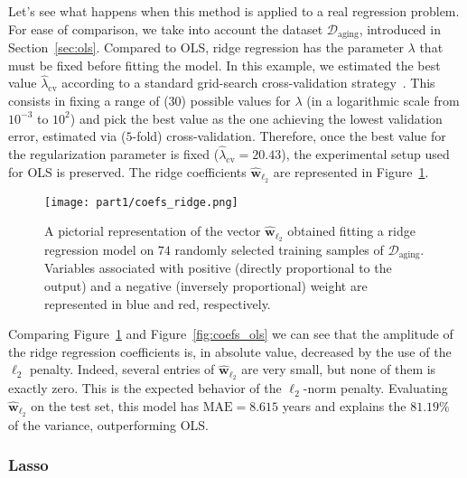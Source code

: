 			Let's see what happens when this method is applied to a real regression problem. For ease of comparison, we take into account the dataset $\mathcal{D}_{\text{aging}}$, introduced in Section~\ref{sec:ols}.
			Compared to OLS, ridge regression has the parameter $\lambda$ that must be fixed before fitting the model. In this example, we estimated the best value $\hat \lambda_{\text{cv}}$ according to a standard grid-search cross-validation strategy~\cite{hastie2009elements}.
			This consists in fixing a range of ($30$) possible values for $\lambda$ (in a logarithmic scale from $10^{-3}$ to $10^2$) and
			pick the best value as the one achieving the lowest validation error, estimated via ($5$-fold) cross-validation.
			Therefore, once the best value for the regularization parameter is fixed ($\hat \lambda_{\text{cv}} = 20.43$), the experimental setup used for OLS is preserved.
			The ridge coefficients $\bm{\hat w}_{\ell_2}$ are represented in Figure~\ref{fig:coefs_ridge}.
			\begin{figure}[!h]
				\centering
				\texttt{[image: part1/coefs\_ridge.png]}
				\caption{A pictorial representation of the vector $\bm{\hat w}_{\ell_2}$ obtained fitting a ridge regression model on $74$ randomly selected training samples of $\mathcal{D}_{\text{aging}}$. Variables associated with positive (\ie directly proportional to the output) and a negative (\ie inversely proportional) weight are represented in blue and red, respectively.} \label{fig:coefs_ridge}
			\end{figure}
			Comparing Figure~\ref{fig:coefs_ridge} and Figure~\ref{fig:coefs_ols} we can see that the amplitude of the ridge regression coefficients is, in absolute value, decreased by the use of the $\ell_2$ penalty. Indeed, several entries of $\bm{\hat w}_{\ell_2}$ are very small, but none of them is exactly zero. This is the expected behavior of the $\ell_2$-norm penalty. Evaluating $\bm{\hat w}_{\ell_2}$ on the test set, this model has  $\text{MAE}=8.615$ years and explains the $81.19\%$ of the variance, outperforming OLS.

			\subsubsection{Lasso} \label{sec:the_lasso}

